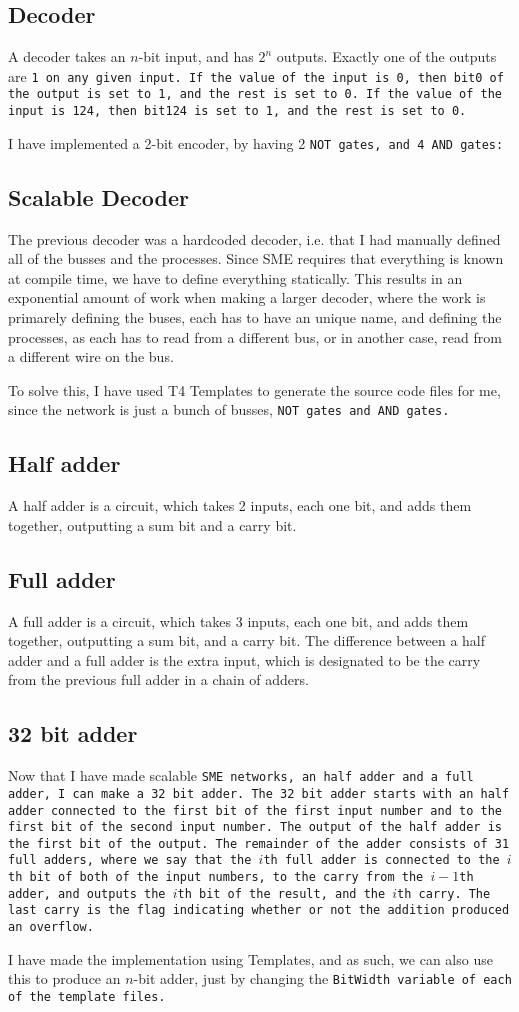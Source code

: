 \subsection{Decoder}
A decoder takes an $n$-bit input, and has $2^n$ outputs. Exactly one of the
outputs are \tt{1} on any given input. If the value of the input is \tt{0}, then
bit0 of the output is set to \tt{1}, and the rest is set to \tt{0}. If the
value of the input is 124, then bit124 is set to \tt{1}, and the rest is set to
\tt{0}.

I have implemented a 2-bit encoder, by having 2 \tt{NOT} gates, and 4 \tt{AND}
gates:

\subsection{Scalable Decoder}
The previous decoder was a hardcoded decoder, i.e. that I had manually defined
all of the busses and the processes. Since SME requires that everything is
known at compile time, we have to define everything statically. This results in
an exponential amount of work when making a larger decoder, where the work is
primarely defining the buses, each has to have an unique name, and defining the
processes, as each has to read from a different bus, or in another case, read
from a different wire on the bus.

To solve this, I have used T4 Templates to generate the source code files for
me, since the network is just a bunch of busses, \tt{NOT} gates and \tt{AND}
gates.

\subsection{Half adder}
A half adder is a circuit, which takes 2 inputs, each one bit, and adds them
together, outputting a sum bit and a carry bit.

\subsection{Full adder}
A full adder is a circuit, which takes 3 inputs, each one bit, and adds them
together, outputting a sum bit, and a carry bit. The difference between a half
adder and a full adder is the extra input, which is designated to be the carry
from the previous full adder in a chain of adders.

\subsection{32 bit adder}
Now that I have made scalable \tt{SME} networks, an half adder and a full
adder, I can make a 32 bit adder. The 32 bit adder starts with an half adder
connected to the first bit of the first input number and to the first bit of
the second input number. The output of the half adder is the first bit of the
output. The remainder of the adder consists of 31 full adders, where we say
that the $i$th full adder is connected to the $i$th bit of both of the input
numbers, to the carry from the $i-1$th adder, and outputs the $i$th bit of the
result, and the $i$th carry. The last carry is the flag indicating whether or
not the addition produced an overflow.

I have made the implementation using Templates, and as such, we can also use
this to produce an $n$-bit adder, just by changing the \tt{BitWidth} variable
of each of the template files.
